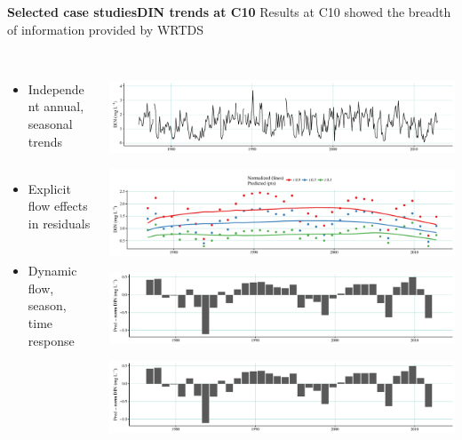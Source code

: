 \documentclass[serif]{beamer}\usepackage[]{graphicx}\usepackage[]{color}
\begin{document}
\begin{frame}{\textbf{Selected case studies}}{\textbf{DIN trends at C10}}
Results at C10 showed the breadth of information provided by WRTDS\\~\\
\begin{columns}
\begin{column}{0.45\textwidth}
\begin{itemize}
\item Independent annual, seasonal trends \\~\\
\item Explicit flow effects in residuals \\~\\
\item Dynamic flow, season, time response
\end{itemize}
\end{column}
\begin{column}{0.35\textwidth}
\centerline{\includegraphics[width = \textwidth, page = 2]{fig/c10obspred.pdf}}
\centerline{\includegraphics[width = \textwidth]{fig/c10prdnrm.pdf}}
\centerline{\includegraphics[width = \textwidth, page = 1]{fig/c10flow.pdf}}
\centerline{\includegraphics[width = \textwidth, page = 2]{fig/c10flow.pdf}}

\end{column}
\end{columns}
\end{frame}
\end{document}
